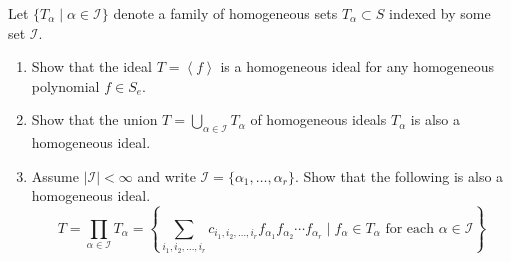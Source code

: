 \documentclass[12 pt, letterpaper]{hmcpset}
\begin{document}
\begin{problem}[Problem 2.]
	Let $\{ T_{\alpha} \mid \alpha \in \mathcal{I} \}$ denote a family of homogeneous sets $T_{\alpha} \subset S$ indexed by some set $\mathcal{I}$.
	\begin{enumerate}
		\item Show that the ideal $T = \left < f \right >$ is a homogeneous ideal for any homogeneous polynomial $f \in S_{e}$.
		\item Show that the union $T = \bigcup_{\alpha \in \mathcal{I}} T_{\alpha}$ of homogeneous ideals $T_{\alpha}$ is also a homogeneous ideal.
		\item Assume $\lvert \mathcal{I} \rvert < \infty$ and write $\mathcal{I} = \{ \alpha_{1}, \dots, \alpha_{r} \}$. Show that the following is also a homogeneous ideal.
			\[
				T = \prod_{\alpha \in \mathcal{I}} T_{\alpha} = \left \{ \sum_{i_{1}, i_{2}, \dots, i_{r}} c_{i_{1}, i_{2}, \dots, i_{r}} f_{\alpha_{1}} f_{\alpha_{2}} \cdots f_{\alpha_{r}} \mid f_{\alpha} \in T_{\alpha} \text{ for each } \alpha \in \mathcal{I} \right \}
			\]
	\end{enumerate}
\end{problem}
\end{document}
